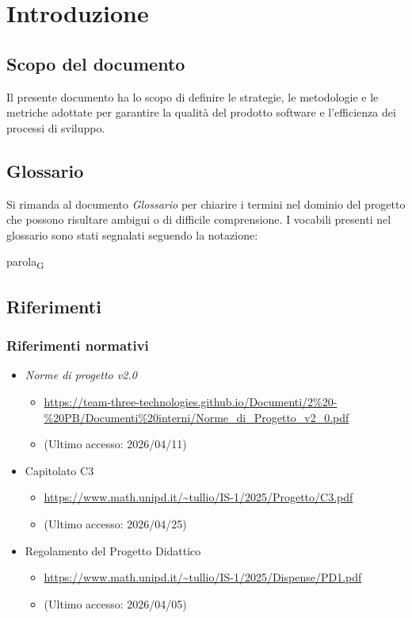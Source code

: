 \documentclass[a4paper,12pt]{article}
\begin{document}
    \section{Introduzione} {
        \subsection{Scopo del documento}
            Il presente documento ha lo scopo di definire le strategie, le metodologie e le metriche adottate per garantire la qualità del prodotto software e l'efficienza dei processi di sviluppo.

        \subsection{Glossario}
            Si rimanda al documento \textit{Glossario} per chiarire i termini nel dominio del progetto che possono risultare ambigui o di difficile comprensione. I vocabili presenti nel glossario sono stati segnalati seguendo la notazione:
            \begin{center}
                parola\textsubscript{G}
            \end{center}
        \subsection{Riferimenti}
            \subsubsection{Riferimenti normativi}
                \begin{itemize}
                    \item \textit{Norme di progetto v2.0}
                    \begin{itemize}
                        \item \url{https://team-three-technologies.github.io/Documenti/2%20-%20PB/Documenti%20interni/Norme_di_Progetto_v2_0.pdf}
                        \item[] (Ultimo accesso: 2026/04/11)
                    \end{itemize}
                    \item Capitolato C3
                    \begin{itemize}
                        \item \url{https://www.math.unipd.it/~tullio/IS-1/2025/Progetto/C3.pdf}
                        \item[] (Ultimo accesso: 2026/04/25)
                    \end{itemize}
                    \item Regolamento del Progetto Didattico
                    \begin{itemize}
                        \item \url{https://www.math.unipd.it/~tullio/IS-1/2025/Dispense/PD1.pdf}
                        \item[] (Ultimo accesso: 2026/04/05)
                    \end{itemize}
                \end{itemize}
}
\end{document}

